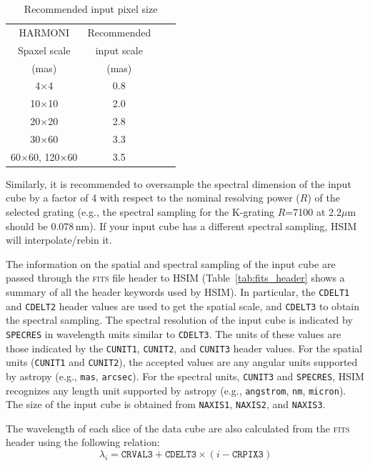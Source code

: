 \documentclass[12pt]{report}
\begin{document}
\begin{table}[h]
\centering
\caption{Recommended input pixel size}
\label{tab:scale}
\begin{tabular}{cccc}
\hline
HARMONI & Recommended\\
Spaxel scale & input scale\\
(mas) & (mas) \\
\hline
4$\times$4   & 0.8 \\
10$\times$10 & 2.0 \\
20$\times$20 & 2.8 \\
30$\times$60 & 3.3 \\
60$\times$60, 120$\times$60 & 3.5 \\
\hline
\end{tabular}
\end{table}

Similarly, it is recommended to oversample the spectral dimension of the input cube by a factor of 4 with respect to the nominal resolving power ($R$) of the selected grating (e.g., the spectral sampling for the K-grating $R$=7100 at 2.2$\mu$m should be 0.078\,nm). If your input cube has a different spectral sampling, HSIM will interpolate\slash rebin it. 

The information on the spatial and spectral sampling of the input cube are passed through the \textsc{fits} file header to HSIM (Table~\ref{tab:fits_header} shows a summary of all the header keywords used by HSIM). In particular, the \texttt{CDELT1} and \texttt{CDELT2} header values are used to get the spatial scale, and \texttt{CDELT3} to obtain the spectral sampling. The spectral resolution of the input cube is indicated by \texttt{SPECRES} in wavelength units similar to \texttt{CDELT3}. The units of these values are those indicated by the \texttt{CUNIT1}, \texttt{CUNIT2}, and \texttt{CUNIT3} header values. For the spatial units (\texttt{CUNIT1} and \texttt{CUNIT2}), the accepted values are any angular units supported by astropy (e.g., \texttt{mas}, \texttt{arcsec}). For the spectral units, \texttt{CUNIT3} and \texttt{SPECRES}, HSIM recognizes any length unit supported by astropy (e.g., \texttt{angstrom}, \texttt{nm}, \texttt{micron}). The size of the input cube is obtained from \texttt{NAXIS1}, \texttt{NAXIS2}, and \texttt{NAXIS3}.


The wavelength of each slice of the data cube are also calculated from the \textsc{fits} header using the following relation:
\begin{equation}\label{eq:lambda}
\lambda_i = \texttt{CRVAL3} + \texttt{CDELT3} \times (i - \texttt{CRPIX3})
\end{equation}
\end{document}
